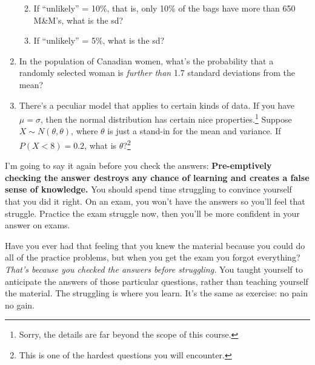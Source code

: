 \documentclass[
  letterpaper,
  DIV=11,
  numbers=noendperiod]{scrreprt}
\providecommand{\tightlist}{%
  \setlength{\itemsep}{0pt}\setlength{\parskip}{0pt}}\usepackage{longtable,booktabs,array}
\begin{document}
\begin{enumerate}
  \begin{enumerate}
  \def\labelenumii{\alph{enumii}.}
  \tightlist
  \item
    If ``unlikely'' = 10\%, that is, only 10\% of the bags have more
    than 650 M\&M's, what is the sd?
  \item
    If ``unlikely'' = 5\%, what is the sd?
  \end{enumerate}
\item
  In the population of Canadian women, what's the probability that a
  randomly selected woman is \emph{further than} 1.7 standard deviations
  from the mean?
\item
  There's a peculiar model that applies to certain kinds of data. If you
  have \(\mu = \sigma\), then the normal distribution has certain nice
  properties.\footnote{Sorry, the details are far beyond the scope of
    this course.} Suppose \(X\sim N(\theta, \theta)\), where \(\theta\)
  is just a stand-in for the mean and variance. If \(P(X < 8) = 0.2\),
  what is \(\theta\)?\footnote{This is one of the hardest questions you
    will encounter.}
\end{enumerate}

I'm going to say it again before you check the answers:
\textbf{Pre-emptively checking the answer destroys any chance of
learning and creates a false sense of knowledge.} You should spend time
struggling to convince yourself that you did it right. On an exam, you
won't have the answers so you'll feel that struggle. Practice the exam
struggle now, then you'll be more confident in your answer on exams.

Have you ever had that feeling that you knew the material because you
could do all of the practice problems, but when you get the exam you
forgot everything? \emph{That's because you checked the answers before
struggling.} You taught yourself to anticipate the answers of those
particular questions, rather than teaching yourself the material. The
struggling is where you learn. It's the same as exercise: no pain no
gain.
\end{document}
